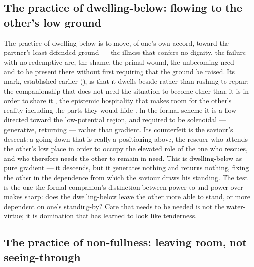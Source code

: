 \subsection{The practice of dwelling-below: flowing to the other's low ground}
\label{p20:sub:practice-chuxia}

The practice of dwelling-below is to move, of one's own accord, toward the partner's least defended ground --- the illness that confers no dignity, the failure with no redemptive arc, the shame, the primal wound, the unbecoming need --- and to be present there without first requiring that the ground be raised. Its mark, established earlier (), is that it dwells beside rather than rushing to repair: the companionship that does not need the situation to become other than it is in order to share it \parencite{paperxix}, the epistemic hospitality that makes room for the other's reality including the parts they would hide \parencite{paperxiii}. In the formal scheme it is a flow directed toward the low-potential region, and required to be solenoidal --- generative, returning --- rather than gradient. Its counterfeit is the saviour's descent: a going-down that is really a positioning-above, the rescuer who attends the other's low place in order to occupy the elevated role of the one who rescues, and who therefore needs the other to remain in need. This is dwelling-below as pure gradient --- it descends, but it generates nothing and returns nothing, fixing the other in the dependence from which the saviour draws his standing. The test is the one the formal companion's distinction between power-to and power-over makes sharp: does the dwelling-below leave the other more able to stand, or more dependent on one's standing-by? Care that needs to be needed is not the water-virtue; it is domination that has learned to look like tenderness.

\subsection{The practice of non-fullness: leaving room, not seeing-through}
\label{p20:sub:practice-buying}

